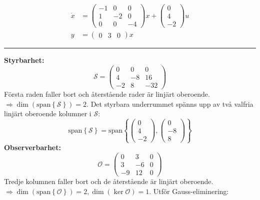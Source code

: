 \documentclass[12pt]{article}
\newcommand{\sspan}[1]{\mathrm{span}\left\{#1\right\}}
\newcommand{\qline}{\hrule \vspace*{10pt}}
\begin{document}
\begin{align*}
  \dot{x} &=
            \begin{pmatrix}
              -1 & 0 & 0 \\
              1 & -2 & 0 \\
              0 & 0 & -4
            \end{pmatrix}x +
                      \begin{pmatrix}
                        0 \\
                        4 \\
                        -2
                      \end{pmatrix}u \\
  y &=
      \begin{pmatrix}
        0 & 3 & 0
      \end{pmatrix}x
\end{align*}
\qline
\textbf{Styrbarhet:}
\[\mathcal{S} =
\begin{pmatrix}
  0 & 0 & 0 \\
  4 & -8 & 16 \\
  -2 & 8 & -32
\end{pmatrix}\]
Första raden faller bort och återstående rader är linjärt oberoende.\\
$\Rightarrow \dim{(\sspan{\mathcal{S}})} = 2$.
Det styrbara underrummet spänns upp av två valfria linjärt oberoende kolumner i $\mathcal{S}$:
\begin{equation*}
  \sspan{\mathcal{S}} = \sspan{
    \begin{pmatrix}
      0 \\
      4 \\
      -2
    \end{pmatrix},
    \begin{pmatrix}
      0 \\
      -8 \\
      8
    \end{pmatrix}}
\end{equation*}
\textbf{Observerbarhet:}
\begin{equation*}
  \mathcal{O} =
  \begin{pmatrix}
    0 & 3 & 0 \\
   3 & -6 & 0 \\
    -9 & 12 & 0
  \end{pmatrix}
\end{equation*}
Tredje kolumnen faller bort och de återstående är linjärt oberoende. \\
$\Rightarrow \dim{(\sspan{\mathcal{O}})} = 2, \dim{(\ker{\mathcal{O}})} = 1$. Utför Gauss-eliminering:
\end{document}

